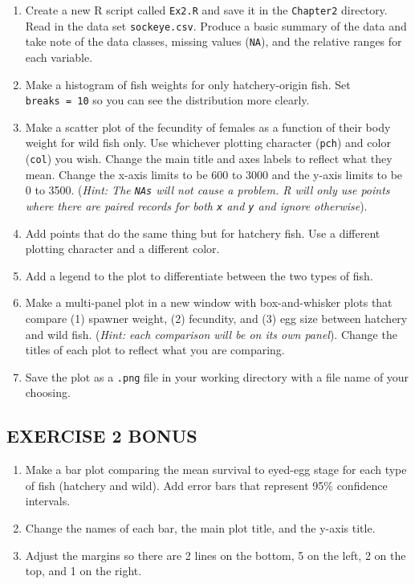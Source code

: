 \documentclass[]{book}
\providecommand{\tightlist}{%
  \setlength{\itemsep}{0pt}\setlength{\parskip}{0pt}}
\theoremstyle{definition}
\theoremstyle{definition}
\theoremstyle{definition}
\theoremstyle{remark}
\begin{document}
\begin{enumerate}
\def\labelenumi{\arabic{enumi}.}
\tightlist
\item
  Create a new R script called \texttt{Ex2.R} and save it in the
  \texttt{Chapter2} directory. Read in the data set
  \texttt{sockeye.csv}. Produce a basic summary of the data and take
  note of the data classes, missing values (\texttt{NA}), and the
  relative ranges for each variable.
\item
  Make a histogram of fish weights for only hatchery-origin fish. Set
  \texttt{breaks\ =\ 10} so you can see the distribution more clearly.
\item
  Make a scatter plot of the fecundity of females as a function of their
  body weight for wild fish only. Use whichever plotting character
  (\texttt{pch}) and color (\texttt{col}) you wish. Change the main
  title and axes labels to reflect what they mean. Change the x-axis
  limits to be 600 to 3000 and the y-axis limits to be 0 to 3500.
  (\emph{Hint: The \texttt{NAs} will not cause a problem. R will only
  use points where there are paired records for both \texttt{x} and
  \texttt{y} and ignore otherwise}).
\item
  Add points that do the same thing but for hatchery fish. Use a
  different plotting character and a different color.
\item
  Add a legend to the plot to differentiate between the two types of
  fish.\\
\item
  Make a multi-panel plot in a new window with box-and-whisker plots
  that compare (1) spawner weight, (2) fecundity, and (3) egg size
  between hatchery and wild fish. (\emph{Hint: each comparison will be
  on its own panel}). Change the titles of each plot to reflect what you
  are comparing.
\item
  Save the plot as a \texttt{.png} file in your working directory with a
  file name of your choosing.
\end{enumerate}

\subsection*{EXERCISE 2 BONUS}\label{exercise-2-bonus}

\begin{enumerate}
\def\labelenumi{\arabic{enumi}.}
\tightlist
\item
  Make a bar plot comparing the mean survival to eyed-egg stage for each
  type of fish (hatchery and wild). Add error bars that represent 95\%
  confidence intervals.
\item
  Change the names of each bar, the main plot title, and the y-axis
  title.\\
\item
  Adjust the margins so there are 2 lines on the bottom, 5 on the left,
  2 on the top, and 1 on the right.
\end{enumerate}
\end{document}
